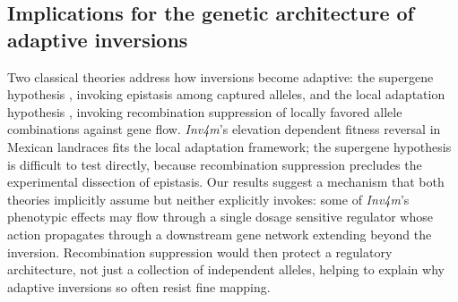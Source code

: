 \documentclass[9pt,twocolumn,twoside]{rilabRxiv}
\newcommand{\invfour}{\textit{Inv4m}\xspace}
\begin{document}

\subsection*{Implications for the genetic architecture of adaptive inversions}
 
Two classical theories address how inversions become adaptive: the supergene hypothesis \citep{dobzhansky1971genetics}, invoking epistasis among captured alleles, and the local adaptation hypothesis \citep{kirkpatrick2006, kirkpatrick2010}, invoking recombination suppression of locally favored allele combinations against gene flow.
\invfour's elevation dependent fitness reversal in Mexican landraces \citep{crow2020} fits the local adaptation framework; the supergene hypothesis is difficult to test directly, because recombination suppression precludes the experimental dissection of epistasis.
Our results suggest a mechanism that both theories implicitly assume but neither explicitly invokes: some of \invfour's phenotypic effects may flow through a single dosage sensitive regulator whose action propagates through a downstream gene network extending beyond the inversion.
Recombination suppression would then protect a regulatory architecture, not just a collection of independent alleles, helping to explain why adaptive inversions so often resist fine mapping.
 
\end{document}
